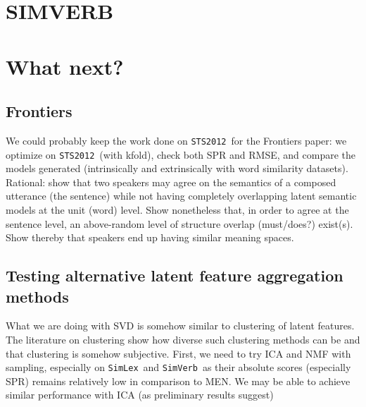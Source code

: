 \documentclass[utf8]{article}
\newcommand\simlex{\texttt{SimLex}}
\newcommand\simverb{\texttt{SimVerb}}
\newcommand\sts{\texttt{STS2012}}
\begin{document}
\section{SIMVERB}



\section{What next?}

\subsection{Frontiers}
We could probably keep the work done on \sts\ for the Frontiers paper: we optimize on \sts\ (with kfold), check both SPR and RMSE, and compare the models generated (intrinsically and extrinsically with word similarity datasets).
Rational: show that two speakers may agree on the semantics of a composed utterance (the sentence) while not having completely overlapping latent semantic models at the unit (word) level. Show nonetheless that, in order to agree at the sentence level, an above-random level of structure overlap (must/does?) exist(s). Show thereby that speakers end up having similar meaning spaces.

\subsection{Testing alternative latent feature aggregation methods}
What we are doing with SVD is somehow similar to clustering of latent features.
The literature on clustering show how diverse such clustering methods can be and that clustering is somehow subjective. First, we need to try ICA and NMF with sampling, especially on \simlex\ and \simverb\ as their absolute scores (especially SPR) remains relatively low in comparison to MEN. We may be able to achieve similar performance with ICA (as preliminary results suggest)
\end{document}
